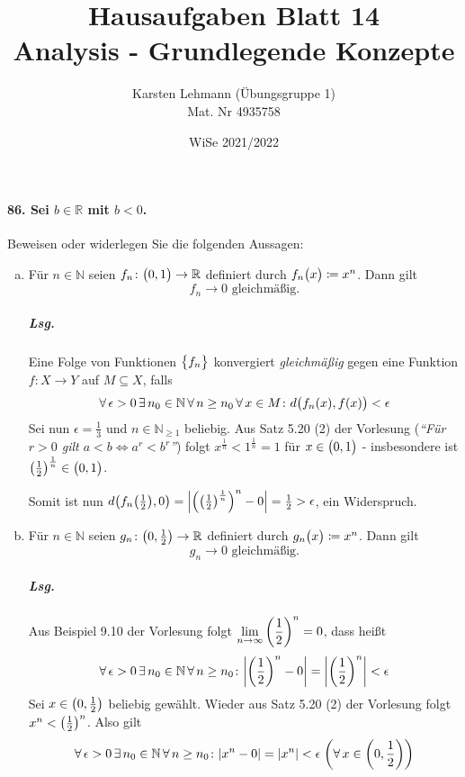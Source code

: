 \documentclass{scrreprt}
\author{Karsten Lehmann (Übungsgruppe 1)\\Mat. Nr 4935758}
\date{WiSe 2021/2022}
\title{Hausaufgaben Blatt 14\\Analysis - Grundlegende Konzepte}
\begin{document}
\paragraph{86. Sei $b \in \mathbb{R}$ mit $b < 0$.}
Beweisen oder widerlegen Sie die folgenden Aussagen:
\begin{enumerate}[(a)]
\item Für $n \in \mathbb{N}$ seien $f_n \colon \qty\big(0, 1) \to \mathbb{R}$
  definiert durch $f_n\qty\big(x) \coloneqq x^n$.
  Dann gilt
  \[
    f_n \to 0 \text{ gleichmäßig.}
  \]
  \subparagraph{Lsg.} Eine Folge von Funktionen $\qty\big{f_n}$ konvergiert
  \emph{gleichmäßig} gegen eine Funktion $f \colon X \to Y$ auf $M \subseteq X$,
  falls
  \[
    \forall\, \epsilon > 0 \,\exists\, n_0 \in \mathbb{N}
    \,\forall\, n \geq n_0 \,\forall\, x \in M \colon
    d\qty\big(f_n(x), f(x)) < \epsilon
  \]
  Sei nun $\epsilon = \frac{1}{3}$ und $n \in \mathbb{N}_{\geq 1}$ beliebig.
  Aus Satz 5.20 (2) der Vorlesung
  (\emph{``Für $r > 0$ gilt $a < b \iff a^r < b^r$''}) folgt
  $x^{\frac{1}{n}} < 1^{\frac{1}{n}} = 1$ für $x \in \qty\big(0, 1)$
  - insbesondere ist $\qty(\frac{1}{2})^{\frac{1}{n}} \in \qty\big(0, 1)$.

  Somit ist nun $d\qty(f_n\qty(\frac{1}{2}), 0) =
  \abs{\qty(\qty(\frac{1}{2})^{\frac{1}{n}})^n - 0} = \frac{1}{2} > \epsilon$,
  ein Widerspruch.

\item Für $n \in \mathbb{N}$ seien
  $g_n \colon \qty(0, \frac{1}{2}) \to \mathbb{R}$ definiert durch
  $g_n\qty\big(x) \coloneqq x^n$.
  Dann gilt
  \[
    g_n \to 0 \text{ gleichmäßig.}
  \]
  \subparagraph{Lsg.} Aus Beispiel 9.10 der Vorlesung folgt
  $\displaystyle \lim_{n \to \infty} \qty(\frac{1}{2})^n = 0$, dass
  heißt
  \[
    \forall\, \epsilon > 0 \,\exists\, n_0 \in \mathbb{N}
    \,\forall\, n \geq n_0 \colon \abs{\qty(\frac{1}{2})^n - 0} =
    \abs{\qty(\frac{1}{2})^n} < \epsilon
  \]
  Sei $x \in \qty(0, \frac{1}{2})$ beliebig gewählt.
  Wieder aus Satz 5.20 (2) der Vorlesung folgt $x^n < \qty(\frac{1}{2})^n$.
  Also gilt
  \[
    \forall\, \epsilon > 0 \,\exists\, n_0 \in \mathbb{N}
    \,\forall\, n \geq n_0 \colon \abs{x^n - 0} =
    \abs{x^n} < \epsilon \; \qty(\forall\, x \in \qty(0, \frac{1}{2}))
  \]
\end{enumerate}
\end{document}
